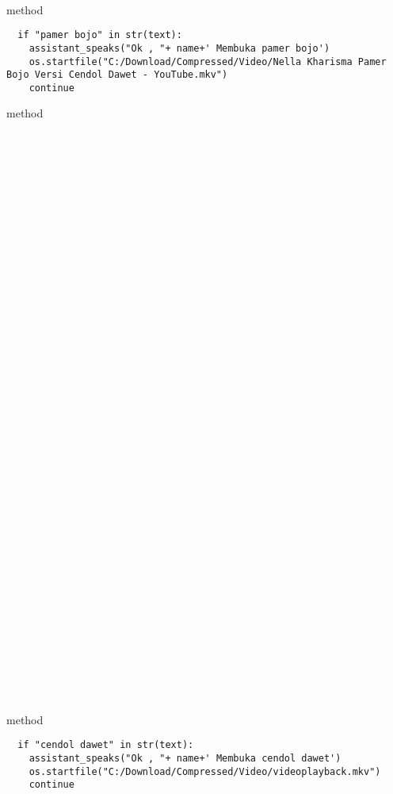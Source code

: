 \\
 method 
\begin{lstlisting}
  if "pamer bojo" in str(text):
    assistant_speaks("Ok , "+ name+' Membuka pamer bojo')
    os.startfile("C:/Download/Compressed/Video/Nella Kharisma Pamer Bojo Versi Cendol Dawet - YouTube.mkv")
    continue
\end{lstlisting}
 method 
\\
\\
\\
\\
\\
\\
\\
\\
\\
\\
\\
\\
\\
\\
\\
\\
\\
\\
\\
\\
\\
\\
\\
\\
\\
\\
\\
\\
\\
\\
\\
\\
\\
\\
\\
\\
\\
\\
\\
 method 
\begin{lstlisting}
  if "cendol dawet" in str(text):
    assistant_speaks("Ok , "+ name+' Membuka cendol dawet')
    os.startfile("C:/Download/Compressed/Video/videoplayback.mkv")
    continue
\end{lstlisting}
\\
\\
\\
\\
\\
\\
